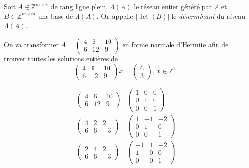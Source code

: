   \begin{definition}
    \label{def:48}
    Soit $A ∈ℤ^{m ×n}$ de rang ligne plein, $Λ(A)$ le réseau entier généré par $A$ et $B ∈ℤ^{m ×m}$  une base de $Λ(A)$. On appelle $|\det(B)|$ le \emph{déterminant} du réseau $Λ(A)$. 
  \end{definition}
 
  
  \begin{example}
    \label{exe:29}
    On va transformer $A = \left(\begin{matrix}4 & 6 & 10\\6 & 12 & 9\end{matrix}\right)$ en forme normale d'Hermite afin de trouver toutes les solutions entières de
    \begin{equation}
      \label{eq:46}
      \left(\begin{matrix}4 & 6 & 10\\6 & 12 & 9\end{matrix}\right) x =
      \begin{pmatrix}
        6 \\ 3
      \end{pmatrix}, \, x ∈ ℤ^3. 
    \end{equation}
    
    \begin{equation}
      \label{eq:45}
      \begin{array}{cc}
      \left(\begin{matrix}4 & 6 & 10\\6 & 12 & 9\end{matrix}\right) &  
\left(\begin{matrix}1 & 0 & 0\\0 & 1 & 0\\0 & 0 & 1\end{matrix}\right) \\

\left(\begin{matrix}4 & 2 & 2\\6 & 6 & -3\end{matrix}\right) &  
\left(\begin{matrix}1 & -1 & -2\\0 & 1 & 0\\0 & 0 & 1\end{matrix}\right) \\

\left(\begin{matrix}2 & 4 & 2\\6 & 6 & -3\end{matrix}\right) &
\left(\begin{matrix}-1 & 1 & -2\\1 & 0 & 0\\0 & 0 & 1\end{matrix}\right)\\


\end{array}
\end{equation}
\end{example}
